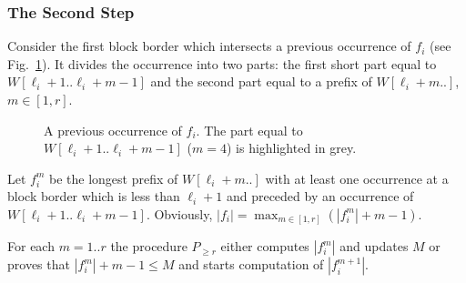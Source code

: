 \documentclass[10pt]{llncs}
\begin{document}
\subsubsection{The Second Step}
Consider the first block border which intersects a previous occurrence of $f_i$ (see Fig.~\ref{fig:LM3}). It divides the occurrence into two parts: the first short part equal to $W[\ell_i+1..\ell_i+m-1]$ and the second part equal to a prefix of $W[\ell_i+m..]$, $m \in [1,r]$.

\begin{figure}[h!]
    \begin{center}
             \caption{A previous occurrence of $f_i$. The part equal to $W[\ell_i+1..\ell_i+m-1]$ ($m = 4$) is highlighted in grey.}
      \label{fig:LM3}
    \end{center}
\end{figure}

Let $f_i^m$ be the longest prefix of $W[\ell_i+m..]$ with at least one occurrence at a block border which is less than $\ell_i+1$ and preceded by an occurrence of $W[\ell_i+1..\ell_i+m-1]$. Obviously, $|f_i| = \max_{m \in [1,r]}(|f_i^m|+m-1)$. 

For each $m = 1..r$ the procedure $P_{\geq r}$ either computes $|f_i^m|$ and updates $M$ or proves that $|f_i^m|+m-1 \leq M$ and starts computation of $|f_i^{m+1}|$.
\end{document}
